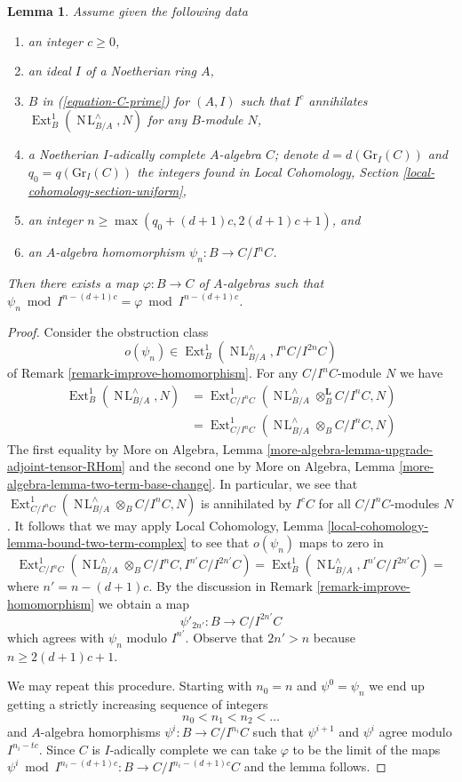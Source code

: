 \documentclass{stacks-project}
\theoremstyle{plain}
\newtheorem{lemma}[subsection]{Lemma}
\theoremstyle{definition}
\theoremstyle{remark}
\numberwithin{equation}{subsection}
\def\Ext{\mathop{\mathrm{Ext}}\nolimits}
\def\NL{\mathop{N\!L}\nolimits}
\begin{document}
\begin{lemma}
\label{lemma-get-morphism-general-better}
Assume given the following data
\begin{enumerate}
\item an integer $c \geq 0$,
\item an ideal $I$ of a Noetherian ring $A$,
\item $B$ in (\ref{equation-C-prime}) for $(A, I)$ such that
$I^c$ annihilates $\Ext^1_B(\NL_{B/A}^\wedge, N)$
for any $B$-module $N$,
\item a Noetherian $I$-adically complete $A$-algebra $C$; denote
$d = d(\text{Gr}_I(C))$ and $q_0 = q(\text{Gr}_I(C))$ the integers found in
Local Cohomology, Section \ref{local-cohomology-section-uniform},
\item an integer $n \geq \max(q_0 + (d + 1)c, 2(d + 1)c + 1)$, and
\item an $A$-algebra homomorphism $\psi_n : B \to C/I^nC$.
\end{enumerate}
Then there exists a map $\varphi : B \to C$ of $A$-algebras such
that $\psi_n \bmod I^{n - (d + 1)c} = \varphi \bmod I^{n - (d + 1)c}$.
\end{lemma}

\begin{proof}
Consider the obstruction class
$$
o(\psi_n) \in \Ext^1_B(\NL_{B/A}^\wedge, I^nC/I^{2n}C)
$$
of Remark \ref{remark-improve-homomorphism}. For any $C/I^nC$-module
$N$ we have
\begin{align*}
\Ext^1_B(\NL_{B/A}^\wedge, N)
& =
\Ext^1_{C/I^nC}(\NL_{B/A}^\wedge \otimes_B^\mathbf{L} C/I^nC, N) \\
& =
\Ext^1_{C/I^nC}(\NL_{B/A}^\wedge \otimes_B C/I^nC, N)
\end{align*}
The first equality by
More on Algebra, Lemma \ref{more-algebra-lemma-upgrade-adjoint-tensor-RHom}
and the second one by
More on Algebra, Lemma \ref{more-algebra-lemma-two-term-base-change}.
In particular, we see that
$\Ext^1_{C/I^nC}(\NL_{B/A}^\wedge \otimes_B C/I^nC, N)$ is annihilated by
$I^cC$ for all $C/I^nC$-modules $N$.
It follows that we may apply
Local Cohomology, Lemma \ref{local-cohomology-lemma-bound-two-term-complex}
to see that $o(\psi_n)$ maps to zero in
$$
\Ext^1_{C/I^nC}(\NL_{B/A}^\wedge \otimes_B C/I^nC, I^{n'}C/I^{2n'}C) =
\Ext^1_B(\NL_{B/A}^\wedge, I^{n'}C/I^{2n'}C) =
$$
where $n' = n - (d + 1)c$. By the discussion in
Remark \ref{remark-improve-homomorphism} we obtain a map
$$
\psi'_{2n'} : B \to C/I^{2n'}C
$$
which agrees with $\psi_n$ modulo $I^{n'}$.
Observe that $2n' > n$ because $n \geq 2(d + 1)c + 1$.

\medskip\noindent
We may repeat this procedure. Starting with $n_0 = n$ and
$\psi^0 = \psi_n$ we end up getting a strictly increasing
sequence of integers
$$
n_0 < n_1 < n_2 < \ldots
$$
and $A$-algebra homorphisms $\psi^i : B \to C/I^{n_i}C$
such that $\psi^{i + 1}$ and $\psi^i$ agree modulo $I^{n_i - tc}$.
Since $C$ is $I$-adically complete we can take $\varphi$
to be the limit of the maps
$\psi^i \bmod I^{n_i - (d + 1)c} : B \to C/I^{n_i - (d + 1)c}C$
and the lemma follows.
\end{proof}
\end{document}
